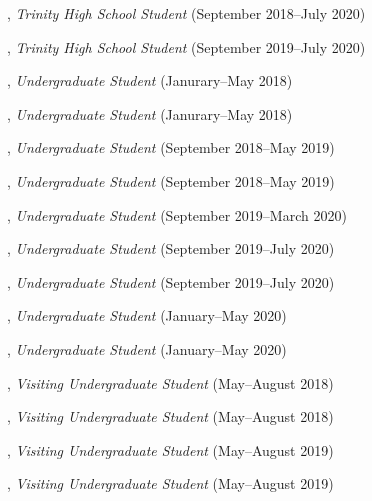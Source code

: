 \documentclass[10pt]{article}
\newenvironment{myindentpar}[1]%
{\begin{list}{}%
         {\setlength{\leftmargin}{#1}}%
         \item[]%
}
{\end{list}}
\newcounter{list}
\begin{document}
\begin{myindentpar}{0.75cm}
	
\hspace{-0.75cm}{\bf Eric Zhang}, \textit{Trinity High School Student} (September 2018--July 2020)

\hspace{-0.75cm}{\bf Michael Florin}, \textit{Trinity High School Student} (September 2019--July 2020)

\hspace{-0.75cm}{\bf Matthew Malir}, \textit{Undergraduate Student} (Janurary--May 2018)
	
\hspace{-0.75cm}{\bf Sebastian Miner}, \textit{Undergraduate Student} (Janurary--May 2018)

\hspace{-0.75cm}{\bf Matthew Schoenbauer}, \textit{Undergraduate Student} (September 2018--May 2019)
	
\hspace{-0.75cm}{\bf Tina Wu}, \textit{Undergraduate Student} (September 2018--May 2019)

\hspace{-0.75cm}{\bf Chan Hee Song}, \textit{Undergraduate Student} (September 2019--March 2020)

\hspace{-0.75cm}{\bf Xiangyu Dong}, \textit{Undergraduate Student} (September 2019--July 2020)

\hspace{-0.75cm}{\bf Tianze Zheng}, \textit{Undergraduate Student} (September 2019--July 2020)

\hspace{-0.75cm}{\bf Alvin Alaphat}, \textit{Undergraduate Student} (January--May 2020)

\hspace{-0.75cm}{\bf Luke Marushack}, \textit{Undergraduate Student} (January--May 2020)

\hspace{-0.75cm}{\bf Wenhao Yu}, \textit{Visiting Undergraduate Student} (May--August 2018)

\hspace{-0.75cm}{\bf Yu Shu}, \textit{Visiting Undergraduate Student} (May--August 2018)

\hspace{-0.75cm}{\bf Chuchen Deng}, \textit{Visiting Undergraduate Student} (May--August 2019)

\hspace{-0.75cm}{\bf Yihong Ma}, \textit{Visiting Undergraduate Student} (May--August 2019)


\end{myindentpar}
\end{document}
